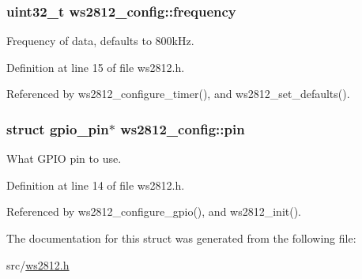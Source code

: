 \subsubsection[{frequency}]{\setlength{\rightskip}{0pt plus 5cm}uint32\+\_\+t ws2812\+\_\+config\+::frequency}\label{structws2812__config_a15634a419d7f20275ec1e6ba1215920b}


Frequency of data, defaults to 800k\+Hz. 



Definition at line 15 of file ws2812.\+h.



Referenced by ws2812\+\_\+configure\+\_\+timer(), and ws2812\+\_\+set\+\_\+defaults().

\hypertarget{structws2812__config_a665ce3190145f97af1d234f9de5defc1}{}
\subsubsection[{pin}]{\setlength{\rightskip}{0pt plus 5cm}struct {\bf gpio\+\_\+pin}$\ast$ ws2812\+\_\+config\+::pin}\label{structws2812__config_a665ce3190145f97af1d234f9de5defc1}


What G\+P\+I\+O pin to use. 



Definition at line 14 of file ws2812.\+h.



Referenced by ws2812\+\_\+configure\+\_\+gpio(), and ws2812\+\_\+init().



The documentation for this struct was generated from the following file\+:\begin{DoxyCompactItemize}
\item 
src/\hyperlink{ws2812_8h}{ws2812.\+h}\end{DoxyCompactItemize}
